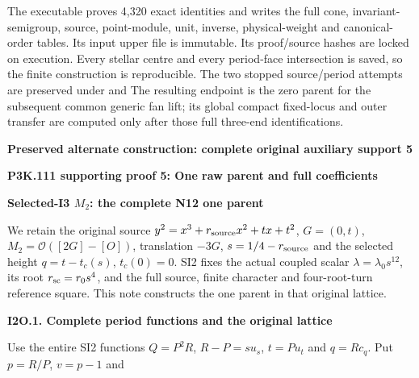 The executable  proves 4,320 exact
identities and writes the full cone, invariant-semigroup, source,
point-module, unit, inverse, physical-weight and canonical-order
tables. Its input upper file is immutable. Its proof/source hashes
are locked on execution. Every stellar centre and every period-face
intersection is saved, so the finite construction is reproducible.
The two stopped source/period attempts are preserved under
 and
The resulting endpoint is the zero parent for the subsequent common
generic fan lift; its global compact fixed-locus and outer transfer
are computed only after those full three-end identifications.






\par\bigskip\noindent\textbf{Preserved alternate construction: complete original auxiliary support 5}\par
\par\bigskip\noindent\textbf{P3K.111 supporting proof 5: One raw parent and full coefficients}\par\nobreak
\par

\medskip\noindent\textbf{Selected-I3 \(M_{2}\): the complete N12 one parent}

\par\nobreak

We retain the original source \(y^{2}=x^{3}+r_{\rm source} x^{2}+t x+t^{2}\), \(G=(0,t)\),
\(M_{2}=\mathcal O([2G]-[O])\), translation \(-3G\), \(s=1/4-r_{\rm source}\) and the selected
height \(q=t-t_c(s)\), \(t_c(0)=0\). SI2 fixes the actual coupled scalar
\(\lambda=\lambda_0 s^{12}\), its root \(r_{\rm sc}=r_{0} s^{4}\), and the full source,
finite character and four-root-turn reference square. This note
constructs the one parent in that original lattice.

\par

\medskip\noindent\textbf{I2O.1. Complete period functions and the original lattice}

\par\nobreak

Use the entire SI2 functions \(Q=P^{2}R\), \(R-P=s u_s\), \(t=P u_t\) and
\(q=R c_q\). Put \(p=R/P\), \(v=p-1\) and

